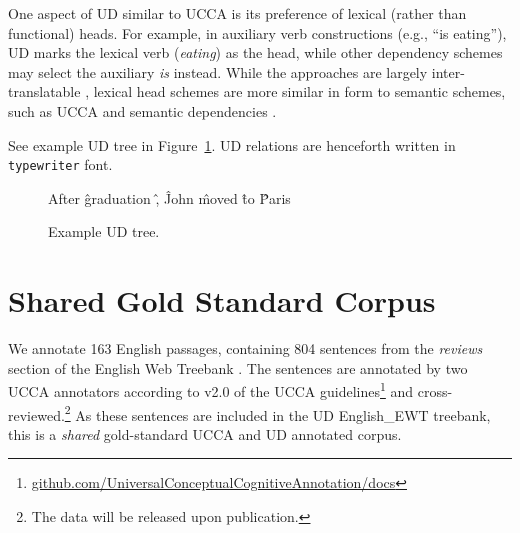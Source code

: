 \documentclass[11pt,a4paper]{article}
\begin{document}
  One aspect of UD similar to UCCA is its preference of lexical (rather than functional) heads.
  For example, in auxiliary verb constructions (e.g., ``is eating''), UD
  marks the lexical verb (\textit{eating}) as the head, while other dependency schemes
  may select the auxiliary \textit{is} instead.
  While the approaches are largely inter-translatable
  \citep{Schwartz:12}, lexical head schemes are more similar in form to semantic schemes,
   such as UCCA and semantic dependencies \citep{oepen2016towards}.
   
See example UD tree in Figure~\ref{fig:original_example_ud}.
UD relations are henceforth written in \texttt{typewriter} font.

\begin{figure}[th]
  \centering
    \begin{dependency}[text only label, label style={above,font=\tt}, font=\small]
    \begin{deptext}[column sep=.8em,ampersand replacement=\^]
    After \^ graduation \^ , \^ John \^ moved \^ to \^ Paris \\
    \end{deptext}
    \end{dependency}
\caption{Example UD tree.\label{fig:original_example_ud}}
\end{figure}


\section{Shared Gold Standard Corpus}\label{sec:shared}

We annotate 163 English passages, containing 804 sentences
from the \textit{reviews} section of the 
English Web Treebank \cite[EWT; ][]{bies2012english}.
The sentences are annotated by two UCCA annotators
according to v2.0 of the UCCA
guidelines\footnote{\tiny\url{github.com/UniversalConceptualCognitiveAnnotation/docs}}
and cross-reviewed.\footnote{The data will be released upon publication.}
As these sentences are included in the UD
English\_EWT treebank, this is a \textit{shared} gold-standard UCCA and UD
annotated corpus.
\end{document}
